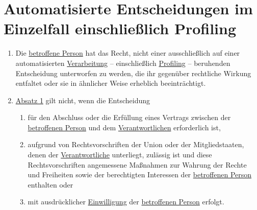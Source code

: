 \chapter{Automatisierte Entscheidungen im Einzelfall einschließlich Profiling}
\label{ch:22}


\begin{enumerate}

  \item Die \hyperref[itm:04-1]{betroffene Person} hat das Recht, nicht einer ausschließlich auf einer
   automatisierten \hyperref[itm:04-2]{Verarbeitung} -- einschließlich \hyperref[itm:04-4]{Profiling} -- beruhenden
   Entscheidung unterworfen zu werden, die ihr gegenüber
   rechtliche Wirkung entfaltet oder sie in ähnlicher Weise erheblich beeinträchtigt.%
  \label{itm:22-1}

  \item \hyperref[itm:22-1]{Absatz 1} gilt nicht, wenn die Entscheidung%
  \label{itm:22-2}

  \begin{enumerate}
  
    \item für den Abschluss oder die Erfüllung eines Vertrags zwischen der \hyperref[itm:04-1]{betroffenen Person} und
     dem \hyperref[itm:04-7]{Verantwortlichen} erforderlich ist,%
    \label{itm:22-2a}

    \item aufgrund von Rechtsvorschriften der Union oder der Mitgliedstaaten, denen der \hyperref[itm:04-7]
     {Verantwortliche} unterliegt, zulässig ist und diese Rechtsvorschriften angemessene Maßnahmen zur Wahrung der
     Rechte und Freiheiten sowie der berechtigten Interessen der \hyperref[itm:04-1]{betroffenen Person} enthalten
     oder%
    \label{itm:22-2b}

    \item mit ausdrücklicher \hyperref[itm:04-11]{Einwilligung} der \hyperref[itm:04-1]{betroffenen Person} erfolgt.%
    \label{itm:22-2c}


\end{enumerate}
\end{enumerate}
